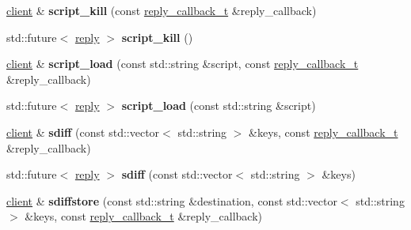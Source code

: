 \begin{DoxyCompactItemize}
\mbox{\hyperlink{classcpp__redis_1_1client}{client}} \& {\bfseries script\+\_\+kill} (const \mbox{\hyperlink{classcpp__redis_1_1client_af7a65eb21aa25230bfbb0b0203c4fc04}{reply\+\_\+callback\+\_\+t}} \&reply\+\_\+callback)
\item 
\mbox{\label{classcpp__redis_1_1client_a35286249f2405afa0cf412472c1067b4}} 
std\+::future$<$ \mbox{\hyperlink{classcpp__redis_1_1reply}{reply}} $>$ {\bfseries script\+\_\+kill} ()
\item 
\mbox{\label{classcpp__redis_1_1client_a1c1d1b3daff14dc29c32d1ea8407efdb}} 
\mbox{\hyperlink{classcpp__redis_1_1client}{client}} \& {\bfseries script\+\_\+load} (const std\+::string \&script, const \mbox{\hyperlink{classcpp__redis_1_1client_af7a65eb21aa25230bfbb0b0203c4fc04}{reply\+\_\+callback\+\_\+t}} \&reply\+\_\+callback)
\item 
\mbox{\label{classcpp__redis_1_1client_a2c42d83c0bfcb46d41d2c205d808e6c8}} 
std\+::future$<$ \mbox{\hyperlink{classcpp__redis_1_1reply}{reply}} $>$ {\bfseries script\+\_\+load} (const std\+::string \&script)
\item 
\mbox{\label{classcpp__redis_1_1client_a9d70980e8fc5c90f218c5fd2215bed89}} 
\mbox{\hyperlink{classcpp__redis_1_1client}{client}} \& {\bfseries sdiff} (const std\+::vector$<$ std\+::string $>$ \&keys, const \mbox{\hyperlink{classcpp__redis_1_1client_af7a65eb21aa25230bfbb0b0203c4fc04}{reply\+\_\+callback\+\_\+t}} \&reply\+\_\+callback)
\item 
\mbox{\label{classcpp__redis_1_1client_a93ff7c295d6147d3d452364533a19de9}} 
std\+::future$<$ \mbox{\hyperlink{classcpp__redis_1_1reply}{reply}} $>$ {\bfseries sdiff} (const std\+::vector$<$ std\+::string $>$ \&keys)
\item 
\mbox{\label{classcpp__redis_1_1client_a0f896b36f3284d66bb1679f535378bf5}} 
\mbox{\hyperlink{classcpp__redis_1_1client}{client}} \& {\bfseries sdiffstore} (const std\+::string \&destination, const std\+::vector$<$ std\+::string $>$ \&keys, const \mbox{\hyperlink{classcpp__redis_1_1client_af7a65eb21aa25230bfbb0b0203c4fc04}{reply\+\_\+callback\+\_\+t}} \&reply\+\_\+callback)
\item 

\end{DoxyCompactItemize}
